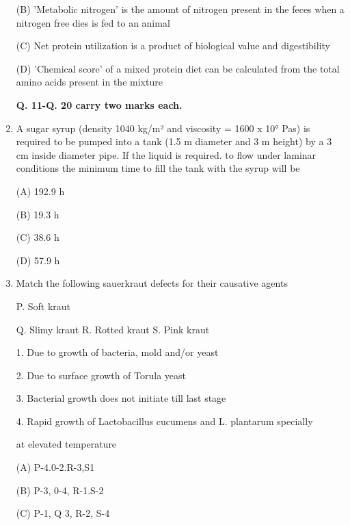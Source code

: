 \documentclass[journal]{IEEEtran}
\begin{document}
\begin{enumerate}
{(B) 'Metabolic nitrogen' is the amount of nitrogen present in the feces when a nitrogen free dies is fed to an animal

(C) Net protein utilization is a product of biological value and digestibility

(D) 'Chemical score' of a mixed protein diet can be calculated from the total amino acids present in the mixture}
\begin{center}
\textbf{Q. 11-Q. 20 carry two marks each.}
\end{center}
\item {A sugar syrup (density 1040 kg/m² and viscosity = 1600 x 10° Pas) is required to be pumped into a tank (1.5 m diameter and 3 m height) by a 3 cm inside diameter pipe. If the liquid is required. to flow under laminar conditions the minimum time to fill the tank with the syrup will be

(A) 192.9 h

(B) 19.3 h

(C) 38.6 h

(D) 57.9 h
}
\item {Match the following sauerkraut defects for their causative agents}
\begin{minipage}{0.5\textwidth}
	\begin{flushleft}


P. Soft kraut


Q. Slimy kraut
R. Rotted kraut
S. Pink kraut

		\end{flushleft}
		\end{minipage}
	\begin{minipage}{0.5\textwidth}
		\begin{flushright}

1. Due to growth of bacteria, mold and/or yeast

2. Due to surface growth of Torula yeast


3. Bacterial growth does not initiate till last stage


4. Rapid growth of Lactobacillus cucumens and L. plantarum specially



		\end{flushright}
		\end{minipage}

at elevated temperature

(A) P-4.0-2.R-3,S1

(B) P-3, 0-4, R-1.S-2

(C) P-1, Q 3, R-2, S-4


\end{enumerate}
\end{document}
